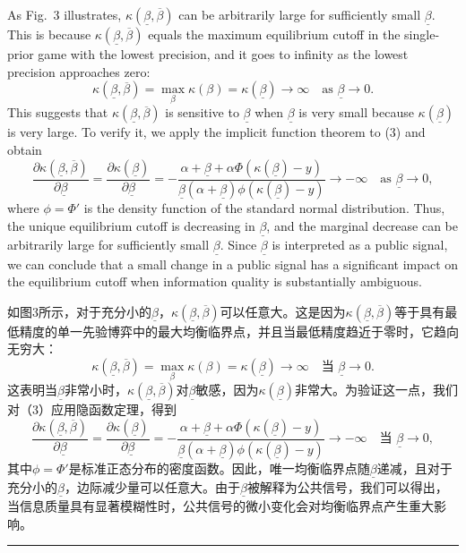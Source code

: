 \documentclass[12pt,a4paper]{article}
\newenvironment{original}
  {\par\medskip\noindent\color{black}\ignorespaces}
  {\par\medskip}
\newenvironment{translation}
  {\par\noindent\color{darkblue}\ignorespaces}
  {\par\medskip\noindent\hrule\par\medskip}
\theoremstyle{definition}
\theoremstyle{remark}
\begin{document}
\begin{original}
As Fig.\ 3 illustrates, $\kappa(\underline{\beta}, \overline{\beta})$ can be arbitrarily large for sufficiently small $\underline{\beta}$. This is because $\kappa(\underline{\beta}, \overline{\beta})$ equals the maximum equilibrium cutoff in the single-prior game with the lowest precision, and it goes to infinity as the lowest precision approaches zero:
\[
\kappa(\underline{\beta}, \overline{\beta}) = \max_{\beta} \kappa(\beta) = \kappa(\underline{\beta}) \to \infty \quad \text{as } \underline{\beta} \to 0.
\]
This suggests that $\kappa(\underline{\beta}, \overline{\beta})$ is sensitive to $\underline{\beta}$ when $\underline{\beta}$ is very small because $\kappa(\underline{\beta})$ is very large. To verify it, we apply the implicit function theorem to (3) and obtain
\[
\frac{\partial \kappa(\underline{\beta}, \overline{\beta})}{\partial \underline{\beta}} = \frac{\partial \kappa(\underline{\beta})}{\partial \underline{\beta}} = -\frac{\alpha + \underline{\beta} + \alpha\Phi(\kappa(\underline{\beta}) - y)}{\underline{\beta}(\alpha + \underline{\beta})\phi(\kappa(\underline{\beta}) - y)} \to -\infty \quad \text{as } \underline{\beta} \to 0,
\]
where $\phi = \Phi'$ is the density function of the standard normal distribution. Thus, the unique equilibrium cutoff is decreasing in $\underline{\beta}$, and the marginal decrease can be arbitrarily large for sufficiently small $\underline{\beta}$. Since $\underline{\beta}$ is interpreted as a public signal, we can conclude that a small change in a public signal has a significant impact on the equilibrium cutoff when information quality is substantially ambiguous.
\end{original}
\begin{translation}
如图3所示，对于充分小的$\underline{\beta}$，$\kappa(\underline{\beta}, \overline{\beta})$可以任意大。这是因为$\kappa(\underline{\beta}, \overline{\beta})$等于具有最低精度的单一先验博弈中的最大均衡临界点，并且当最低精度趋近于零时，它趋向无穷大：
\[
\kappa(\underline{\beta}, \overline{\beta}) = \max_{\beta} \kappa(\beta) = \kappa(\underline{\beta}) \to \infty \quad \text{当 } \underline{\beta} \to 0.
\]
这表明当$\underline{\beta}$非常小时，$\kappa(\underline{\beta}, \overline{\beta})$对$\underline{\beta}$敏感，因为$\kappa(\underline{\beta})$非常大。为验证这一点，我们对（3）应用隐函数定理，得到
\[
\frac{\partial \kappa(\underline{\beta}, \overline{\beta})}{\partial \underline{\beta}} = \frac{\partial \kappa(\underline{\beta})}{\partial \underline{\beta}} = -\frac{\alpha + \underline{\beta} + \alpha\Phi(\kappa(\underline{\beta}) - y)}{\underline{\beta}(\alpha + \underline{\beta})\phi(\kappa(\underline{\beta}) - y)} \to -\infty \quad \text{当 } \underline{\beta} \to 0,
\]
其中$\phi = \Phi'$是标准正态分布的密度函数。因此，唯一均衡临界点随$\underline{\beta}$递减，且对于充分小的$\underline{\beta}$，边际减少量可以任意大。由于$\underline{\beta}$被解释为公共信号，我们可以得出，当信息质量具有显著模糊性时，公共信号的微小变化会对均衡临界点产生重大影响。
\end{translation}
\end{document}
